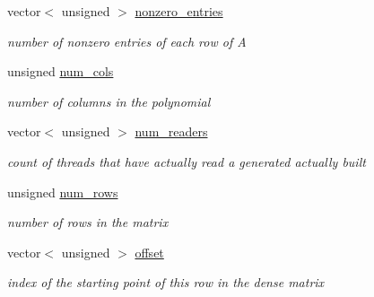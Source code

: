 \begin{DoxyCompactItemize}
vector$<$ unsigned $>$ \hyperlink{group___g_b_computation_a55db3cd23309e08acfbce3b6d2feec85}{nonzero\+\_\+entries}
\begin{DoxyCompactList}\small\item\em number of nonzero entries of each row of A \end{DoxyCompactList}\item 
\mbox{\label{group___g_b_computation_a89273e870d32497bb2a45fb74461194e}} 
unsigned \hyperlink{group___g_b_computation_a89273e870d32497bb2a45fb74461194e}{num\+\_\+cols}
\begin{DoxyCompactList}\small\item\em number of columns in the polynomial \end{DoxyCompactList}\item 
\mbox{\label{group___g_b_computation_ac160863a9b65b41bb6069740ca883da8}} 
vector$<$ unsigned $>$ \hyperlink{group___g_b_computation_ac160863a9b65b41bb6069740ca883da8}{num\+\_\+readers}
\begin{DoxyCompactList}\small\item\em count of threads that have actually read a generated actually built \end{DoxyCompactList}\item 
\mbox{\label{group___g_b_computation_a4c95ce9de848b6a4312ae19fef8980b3}} 
unsigned \hyperlink{group___g_b_computation_a4c95ce9de848b6a4312ae19fef8980b3}{num\+\_\+rows}
\begin{DoxyCompactList}\small\item\em number of rows in the matrix \end{DoxyCompactList}\item 
\mbox{\label{group___g_b_computation_a5686aed4d209fd6e2596b19e060d3c29}} 
vector$<$ unsigned $>$ \hyperlink{group___g_b_computation_a5686aed4d209fd6e2596b19e060d3c29}{offset}
\begin{DoxyCompactList}\small\item\em index of the starting point of this row in the dense matrix \end{DoxyCompactList}\item 
\mbox{\label{group___g_b_computation_a90488d65365fd6a5512ccda45780acc5}} 

\end{DoxyCompactItemize}
